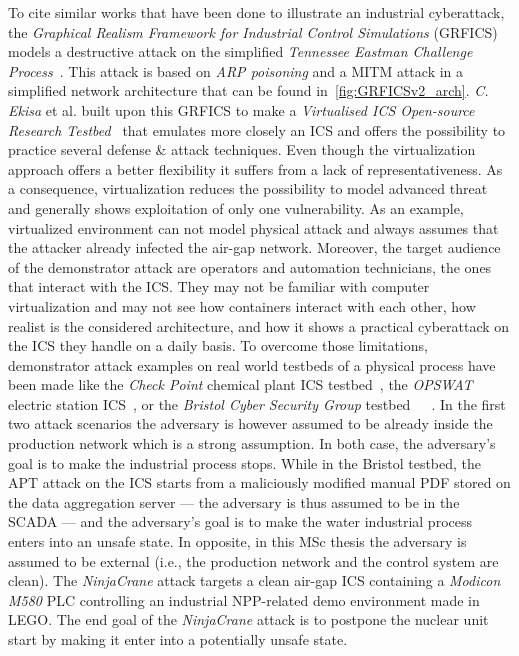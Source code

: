 To cite similar works that have been done to illustrate an industrial cyberattack, the \emph{Graphical Realism Framework for Industrial Control Simulations} (GRFICS) models a destructive attack on the simplified \emph{Tennessee Eastman Challenge Process}~\cite{GRFICS18}. This attack is based on \emph{ARP poisoning} and a MITM attack in a simplified network architecture that can be found in~\autoref{fig:GRFICSv2_arch}. \emph{C. Ekisa} et al. built upon this GRFICS to make a \emph{Virtualised ICS Open-source Research Testbed}~\cite{Ekisa22} that emulates more closely an ICS and offers the possibility to practice several defense \& attack techniques. Even though the virtualization approach offers a better flexibility it suffers from a lack of representativeness. As a consequence, virtualization reduces the possibility to model advanced threat and generally shows exploitation of only one vulnerability. As an example, virtualized environment can not model physical attack and always assumes that the attacker already infected the air-gap network. Moreover, the target audience of the demonstrator attack are operators and automation technicians, the ones that interact with the ICS. They may not be familiar with computer virtualization and may not see how containers interact with each other, how realist is the considered architecture, and how it shows a practical cyberattack on the ICS they handle on a daily basis. To overcome those limitations, demonstrator attack examples on real world testbeds of a physical process have been made like the \emph{Check Point} chemical plant ICS testbed~\cite{checkpoint2023}, the \emph{OPSWAT} electric station ICS~\cite{opswat22}, or the \emph{Bristol Cyber Security Group} testbed~\cite{Gardiner19}~\cite{Craggs19}~\cite{Rashid20}. In the first two attack scenarios the adversary is however assumed to be already inside the production network which is a strong assumption. In both case, the adversary's goal is to make the industrial process stops. While in the Bristol testbed, the APT attack on the ICS starts from a maliciously modified manual PDF stored on the data aggregation server — the adversary is thus assumed to be in the SCADA — and the adversary's goal is to make the water industrial process enters into an unsafe state. In opposite, in this MSc thesis the adversary is assumed to be external (i.e., the production network and the control system are clean). The \emph{NinjaCrane} attack targets a clean air-gap ICS containing a \emph{Modicon M580} PLC controlling an industrial NPP-related demo environment made in LEGO\texttrademark. The end goal of the \emph{NinjaCrane} attack is to postpone the nuclear unit start by making it enter into a potentially unsafe state. 


